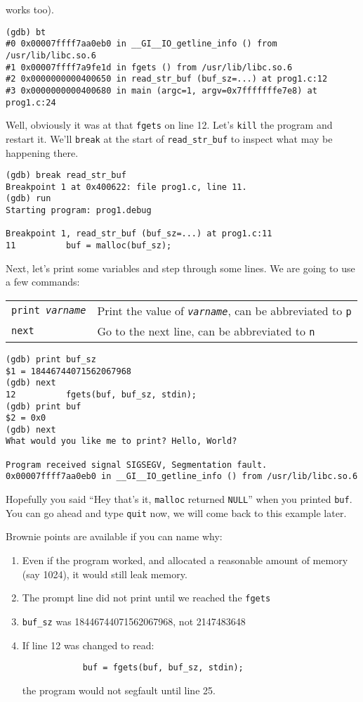\documentclass[11pt]{article}
\begin{document}
works too).
\begin{termbox}
\begin{verbatim}
(gdb) bt
#0 0x00007ffff7aa0eb0 in __GI__IO_getline_info () from /usr/lib/libc.so.6
#1 0x00007ffff7a9fe1d in fgets () from /usr/lib/libc.so.6
#2 0x0000000000400650 in read_str_buf (buf_sz=...) at prog1.c:12
#3 0x0000000000400680 in main (argc=1, argv=0x7fffffffe7e8) at prog1.c:24
\end{verbatim}
\end{termbox}
Well, obviously it was at that \texttt{fgets} on line 12. Let's \texttt{kill}
the program and restart it. We'll \texttt{break} at the start of
\texttt{read\_str\_buf} to inspect what may be happening there.
\begin{termbox}
\begin{verbatim}
(gdb) break read_str_buf
Breakpoint 1 at 0x400622: file prog1.c, line 11.
(gdb) run
Starting program: prog1.debug

Breakpoint 1, read_str_buf (buf_sz=...) at prog1.c:11
11          buf = malloc(buf_sz);
\end{verbatim}
\end{termbox}
Next, let's print some variables and step through some lines. We are going to
use a few commands:
\begin{tabular}{l l}
    \texttt{print \emph{varname}} & Print the value of \texttt{\emph{varname}},
    can be abbreviated to \texttt{p} \\
    \texttt{next} & Go to the next line, can be abbreviated to \texttt{n} \\
\end{tabular}
\begin{termbox}
\begin{verbatim}
(gdb) print buf_sz
$1 = 18446744071562067968
(gdb) next
12          fgets(buf, buf_sz, stdin);
(gdb) print buf
$2 = 0x0
(gdb) next
What would you like me to print? Hello, World?

Program received signal SIGSEGV, Segmentation fault.
0x00007ffff7aa0eb0 in __GI__IO_getline_info () from /usr/lib/libc.so.6
\end{verbatim}
\end{termbox}
Hopefully you said ``Hey that's it, \texttt{malloc} returned \texttt{NULL}''
when you printed \texttt{buf}. You can go ahead and type \texttt{quit} now, we
will come back to this example later.

Brownie points are available if you can name why:
\begin{enumerate}
    \item Even if the program worked, and allocated a reasonable amount of
        memory (say 1024), it would still leak memory.
    \item The prompt line did not print until we reached the \texttt{fgets}
    \item \texttt{buf\_sz} was 18446744071562067968, not 2147483648
    \item If line 12 was changed to read:
        \begin{verbatim}
            buf = fgets(buf, buf_sz, stdin);
        \end{verbatim}
        the program would not segfault until line 25.
\end{enumerate}
\end{document}
